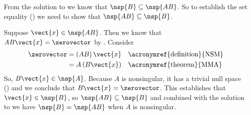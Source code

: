 From the solution to  we know that $\nsp{B}\subseteq\nsp{AB}$.  So to establish the set equality () we need to show that $\nsp{AB}\subseteq\nsp{B}$.\par
%
Suppose $\vect{x}\in\nsp{AB}$.  Then we know that $AB\vect{x}=\zerovector$ by .  Consider
%
\begin{align*}
\zerovector
&=\left(AB\right)\vect{x}&&\text{\acronymref{definition}{NSM}}\\
&=A\left(B\vect{x}\right)&&\text{\acronymref{theorem}{MMA}}
\end{align*}
%
So, $B\vect{x}\in\nsp{A}$.  Because $A$ is nonsingular, it has a trivial null space () and we conclude that $B\vect{x}=\zerovector$.  This establishes that $\vect{x}\in\nsp{B}$, so $\nsp{AB}\subseteq\nsp{B}$ and combined with the solution to  we have $\nsp{B}=\nsp{AB}$ when $A$ is nonsingular.